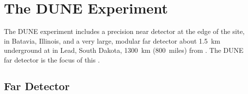 
\section{The DUNE Experiment}

The DUNE experiment includes a precision near detector at the edge of the \fnal site, in Batavia, Illinois, and a very large, modular far detector about \SI{1.5}{km} underground at \surf in Lead, South Dakota, \SI{1300}{km} (\SI{800}{miles}) from \fnal. The DUNE far detector is the focus of this . 


\subsection{Far Detector}
\label{ch:dune-det-tech-ov-fd}



